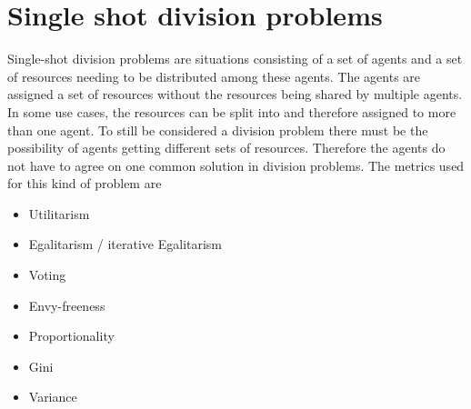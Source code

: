 \documentclass[german, a4paper, 11pt, oneside]{scrbook}
\begin{document}
\section{Single shot division problems}
Single-shot division problems are situations consisting of a set of agents and a set of resources needing to be distributed among these agents. The agents are assigned a set of resources without the resources being shared by multiple agents. In some use cases, the resources can be split into and therefore assigned to more than one agent. To still be considered a division problem there must be the possibility of agents getting different sets of resources. Therefore the agents do not have to agree on one common solution in division problems. The metrics used for this kind of problem are
\begin{itemize}
  \item Utilitarism
  \item Egalitarism / iterative Egalitarism
  \item Voting
  \item Envy-freeness
  \item Proportionality
\item Gini
\item Variance
\end{itemize}
\end{document}
